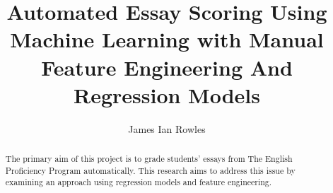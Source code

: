 \documentclass[11pt
              , a4paper
              , oneside
              ]{report}
\title{Automated Essay Scoring Using Machine Learning with Manual Feature Engineering And Regression Models
}
\author{James Ian Rowles}
\date{}
\begin{document}



\begin{abstract}

The primary aim of this project is to grade students' essays from The English Proficiency Program automatically. This research aims to address this issue by examining an approach using regression models and feature engineering.

\end{abstract}


\maketitle

\tableofcontents


\mainmatter










\backmatter



% 
% 



\printbibliography
\end{document}
